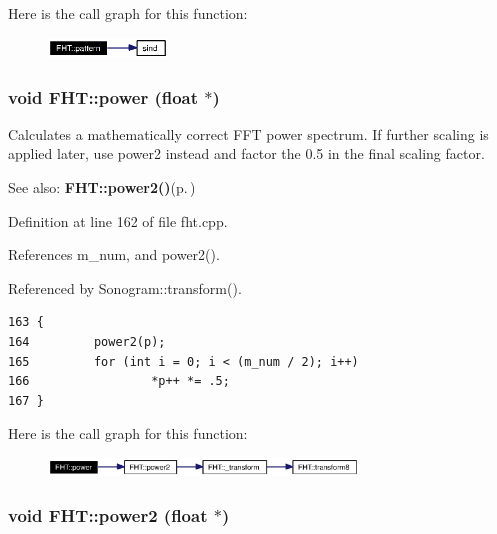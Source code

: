 Here is the call graph for this function:\begin{figure}[H]
\begin{center}
\leavevmode
\includegraphics[width=90pt]{classFHT_FHTa8_cgraph}
\end{center}
\end{figure}
\subsubsection{\setlength{\rightskip}{0pt plus 5cm}void FHT::power (float $\ast$)}\label{classFHT_FHTa12}


Calculates a mathematically correct FFT power spectrum. If further scaling is applied later, use power2 instead and factor the 0.5 in the final scaling factor. \begin{Desc}
\item[See also:]{\bf FHT::power2()}{\rm (p.\,\pageref{classFHT_FHTa13})}\end{Desc}


Definition at line 162 of file fht.cpp.

References m\_\-num, and power2().

Referenced by Sonogram::transform().



\footnotesize\begin{verbatim}163 {
164         power2(p);
165         for (int i = 0; i < (m_num / 2); i++)
166                 *p++ *= .5;
167 }
\end{verbatim}\normalsize 


Here is the call graph for this function:\begin{figure}[H]
\begin{center}
\leavevmode
\includegraphics[width=233pt]{classFHT_FHTa12_cgraph}
\end{center}
\end{figure}
\subsubsection{\setlength{\rightskip}{0pt plus 5cm}void FHT::power2 (float $\ast$)}\label{classFHT_FHTa13}


